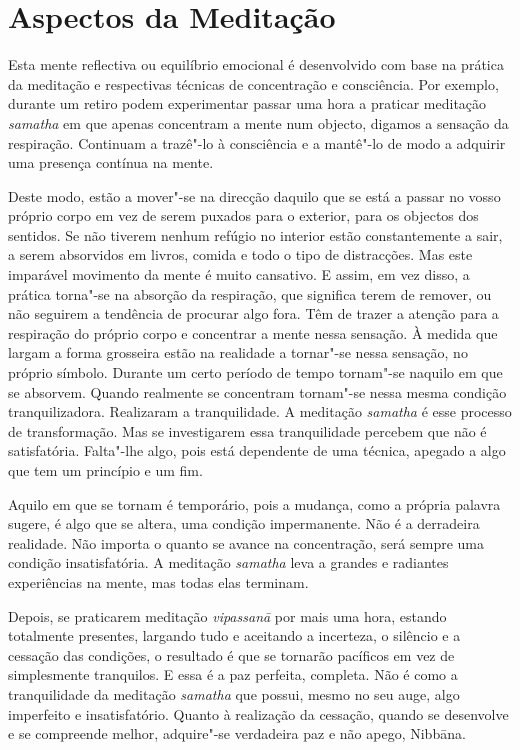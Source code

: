 \section{Aspectos da Meditação}


Esta mente reflectiva ou equilíbrio emocional é desenvolvido com base na prática
da meditação e respectivas técnicas de concentração e consciência. Por
exemplo, durante um retiro podem experimentar passar uma hora a praticar
meditação \emph{samatha} em que apenas concentram a mente num objecto, digamos a
sensação da respiração. Continuam a trazê"-lo à consciência e a mantê"-lo de modo a
adquirir uma presença contínua na mente.

Deste modo, estão a mover"-se na direcção daquilo que se está a passar no vosso
próprio corpo em vez de serem puxados para o exterior, para os objectos dos
sentidos. Se não tiverem nenhum refúgio no interior estão constantemente a sair,
a serem absorvidos em livros, comida e todo o tipo de distracções. Mas este
imparável movimento da mente é muito cansativo. E assim, em vez disso, a prática
torna"-se na absorção da respiração, que significa terem de remover, ou não
seguirem a tendência de procurar algo fora. Têm de trazer a atenção para a
respiração do próprio corpo e concentrar a mente nessa sensação. À medida que
largam a forma grosseira estão na realidade a tornar"-se nessa sensação, no
próprio símbolo. Durante um certo período de tempo tornam"-se naquilo em que se
absorvem. Quando realmente se concentram tornam"-se nessa mesma condição
tranquilizadora. Realizaram a tranquilidade. A meditação \emph{samatha} é esse
processo de transformação. Mas se investigarem essa tranquilidade percebem que
não é satisfatória. Falta"-lhe algo, pois está dependente de uma técnica, apegado
a algo que tem um princípio e um fim.

Aquilo em que se tornam é temporário, pois a mudança, como a própria palavra
sugere, é algo que se altera, uma condição impermanente. Não é a derradeira
realidade. Não importa o quanto se avance na concentração, será sempre uma
condição insatisfatória. A meditação \emph{samatha} leva a grandes e radiantes
experiências na mente, mas todas elas terminam.

Depois, se praticarem meditação \emph{vipassanā} por mais uma hora, estando
totalmente presentes, largando tudo e aceitando a incerteza, o silêncio e a
cessação das condições, o resultado é que se tornarão pacíficos em vez de
simplesmente tranquilos. E essa é a paz perfeita, completa. Não é como a
tranquilidade da meditação \emph{samatha} que possui, mesmo no seu auge, algo
imperfeito e insatisfatório. Quanto à realização da cessação, quando se
desenvolve e se compreende melhor, adquire"-se verdadeira paz e não apego,
Nibbāna.

